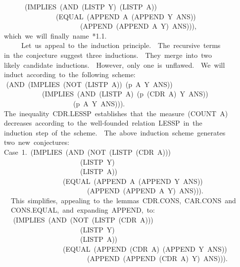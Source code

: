 \documentclass[10pt]{book}
\newenvironment{pubasis}{\begin{flushleft}}{\end{flushleft}}
\begin{document}
\begin{pubasis}
~~~~~~~~(IMPLIES~(AND~(LISTP~Y)~(LISTP~A))\\
~~~~~~~~~~~~~~~~~(EQUAL~(APPEND~A~(APPEND~Y~ANS))\\
~~~~~~~~~~~~~~~~~~~~~~~~(APPEND~(APPEND~A~Y)~ANS))),\\

~~which~we~will~finally~name~*1.1.\\

~~~~~~~Let~us~appeal~to~the~induction~principle.~~The~recursive~terms\\
~~in~the~conjecture~suggest~three~inductions.~~They~merge~into~two\\
~~likely~candidate~inductions.~~However,~only~one~is~unflawed.~~We~will\\
~~induct~according~to~the~following~scheme:\\
~~	(AND~(IMPLIES~(NOT~(LISTP~A))~(p~A~Y~ANS))\\
~~~~~~~~~~~~~(IMPLIES~(AND~(LISTP~A)~(p~(CDR~A)~Y~ANS))\\
~~~~~~~~~~~~~~~~~~~~~~(p~A~Y~ANS))).\\
~~The~inequality~CDR.LESSP~establishes~that~the~measure~(COUNT~A)\\
~~decreases~according~to~the~well-founded~relation~LESSP~in~the\\
~~induction~step~of~the~scheme.~~The~above~induction~scheme~generates\\
~~two~new~conjectures:\\

~~Case~1.~(IMPLIES~(AND~(NOT~(LISTP~(CDR~A)))\\
~~~~~~~~~~~~~~~~~~~~~~~~(LISTP~Y)\\
~~~~~~~~~~~~~~~~~~~~~~~~(LISTP~A))\\
~~~~~~~~~~~~~~~~~~~(EQUAL~(APPEND~A~(APPEND~Y~ANS))\\
~~~~~~~~~~~~~~~~~~~~~~~~~~(APPEND~(APPEND~A~Y)~ANS))).\\

~~~~This~simplifies,~appealing~to~the~lemmas~CDR.CONS,~CAR.CONS~and\\
~~~~CONS.EQUAL,~and~expanding~APPEND,~to:\\

~~	~~(IMPLIES~(AND~(NOT~(LISTP~(CDR~A)))\\
~~~~~~~~~~~~~~~~~~~~~~~~(LISTP~Y)\\
~~~~~~~~~~~~~~~~~~~~~~~~(LISTP~A))\\
~~~~~~~~~~~~~~~~~~~(EQUAL~(APPEND~(CDR~A)~(APPEND~Y~ANS))\\
~~~~~~~~~~~~~~~~~~~~~~~~~~(APPEND~(APPEND~(CDR~A)~Y)~ANS))).\\


\end{pubasis}
\end{document}
